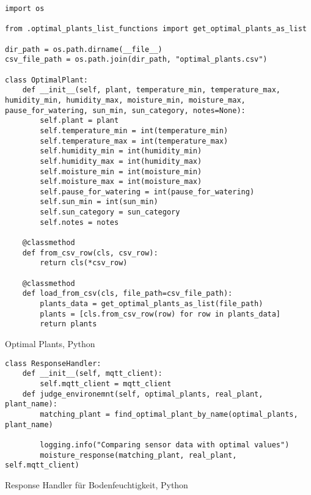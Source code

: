 \begin{longlisting}
\begin{verbatim}
import os

from .optimal_plants_list_functions import get_optimal_plants_as_list

dir_path = os.path.dirname(__file__)
csv_file_path = os.path.join(dir_path, "optimal_plants.csv")

class OptimalPlant:
    def __init__(self, plant, temperature_min, temperature_max, humidity_min, humidity_max, moisture_min, moisture_max, pause_for_watering, sun_min, sun_category, notes=None):
        self.plant = plant
        self.temperature_min = int(temperature_min)
        self.temperature_max = int(temperature_max)
        self.humidity_min = int(humidity_min)
        self.humidity_max = int(humidity_max)
        self.moisture_min = int(moisture_min)
        self.moisture_max = int(moisture_max)
        self.pause_for_watering = int(pause_for_watering)
        self.sun_min = int(sun_min)
        self.sun_category = sun_category
        self.notes = notes

    @classmethod
    def from_csv_row(cls, csv_row):
        return cls(*csv_row)
    
    @classmethod
    def load_from_csv(cls, file_path=csv_file_path):
        plants_data = get_optimal_plants_as_list(file_path)
        plants = [cls.from_csv_row(row) for row in plants_data]
        return plants
\end{verbatim}
\caption{Optimal Plants, Python}\label{cde:applicationService}
\end{longlisting}
\newpage


\begin{longlisting}
\begin{verbatim}
class ResponseHandler:
    def __init__(self, mqtt_client):
        self.mqtt_client = mqtt_client
    def judge_environemnt(self, optimal_plants, real_plant, plant_name):
        matching_plant = find_optimal_plant_by_name(optimal_plants, plant_name)

        logging.info("Comparing sensor data with optimal values")
        moisture_response(matching_plant, real_plant, self.mqtt_client)
\end{verbatim}
\caption{Response Handler für Bodenfeuchtigkeit, Python}\label{cde:applicationService}
\end{longlisting}
\newpage



